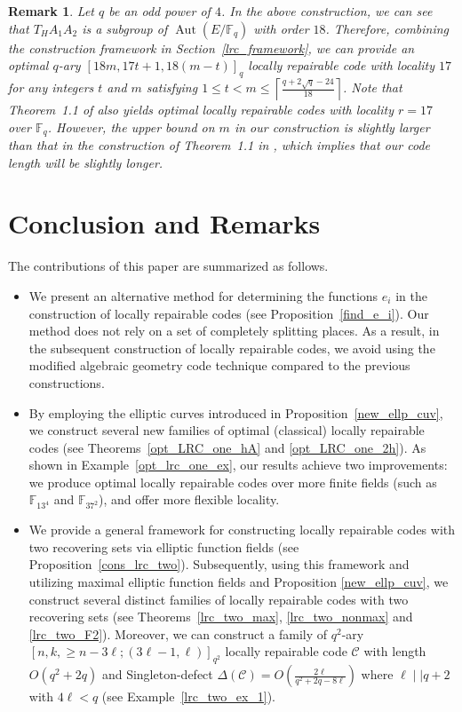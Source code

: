 \documentclass[journal,12pt,onecolumn]{IEEEtran}
\newtheorem{remark}{Remark}
\begin{document}
\begin{remark}
    Let \( q \) be an odd power of \( 4 \). In the above construction, we can see that \(T_HA_1A_2\) is a subgroup of \( \operatorname{Aut}(E/\mathbb{F}_q) \) with order \(18\). Therefore, combining the construction framework in Section~\ref{lrc_framework}, we can provide an optimal \( q \)-ary \([18m, 17t+1, 18(m-t)]_{q}\) locally repairable code with locality \( 17 \) for any integers \( t \) and \( m \) satisfying \(1 \leq t < m \leq \left\lceil \frac{q+2\sqrt{q}-24}{18} \right\rceil \). Note that Theorem~1.1 of \cite{MA2023105686} also yields optimal locally repairable codes with locality \( r = 17 \) over \(\mathbb{F}_q\). However, the upper bound on \(m\) in our construction is slightly larger than that in the construction of Theorem~1.1 in \cite{MA2023105686}, which implies that our code length will be slightly longer.
\end{remark}





\section{Conclusion and Remarks}\label{conclusion}

The contributions of this paper are summarized as follows.
\begin{itemize}
    \item We present an alternative method for determining the functions \( e_i \) in the construction of locally repairable codes (see Proposition~\ref{find_e_i}). Our method does not rely on a set of completely splitting places. As a result, in the subsequent construction of locally repairable codes, we avoid using the modified algebraic geometry code technique compared to the previous constructions. 
    \item By employing the elliptic curves introduced in Proposition~\ref{new_ellp_cuv}, we construct several new families of optimal (classical) locally repairable codes (see Theorems~\ref{opt_LRC_one_hA} and \ref{opt_LRC_one_2h}). As shown in Example~\ref{opt_lrc_one_ex}, our results achieve two improvements: we produce optimal locally repairable codes over more finite fields (such as \(\mathbb{F}_{13^4}\) and \(\mathbb{F}_{37^2}\)), and offer more flexible locality. 
    \item We provide a general framework for constructing locally repairable codes with two recovering sets via elliptic function fields (see Proposition~\ref{cons_lrc_two}). Subsequently, using this framework and utilizing maximal elliptic function fields and Proposition \ref{new_ellp_cuv}, we construct several distinct families of locally repairable codes with two recovering sets (see Theorems~\ref{lrc_two_max}, \ref{lrc_two_nonmax} and \ref{lrc_two_F2}). Moreover, we can construct a family of \( q^2 \)-ary \([n, k, \ge n - 3\ell;(3\ell-1,\ell)]_{q^2}\) locally repairable code \(\mathcal{C}\) with length \(O(q^2 + 2q)\) and Singleton-defect \(\Delta(\mathcal{C})  = O\!\left(\frac{2\ell}{q^2 + 2q - 8\ell}\right) \) where \(\ell \mid\mid q + 2\) with \(4\ell<q\) (see Example~\ref{lrc_two_ex_1}). 
\end{itemize}
\end{document}
